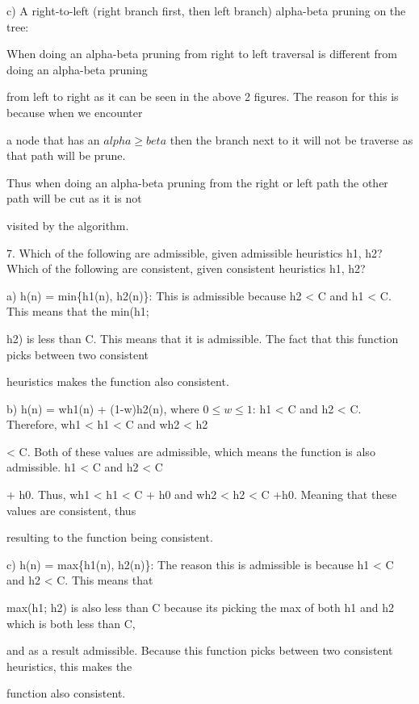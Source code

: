 \documentclass{article}
\begin{document}
c) A right-to-left (right branch first, then left branch)
alpha-beta pruning on the tree:
\newline
{}
\newline
\par
When doing an alpha-beta pruning from right to left traversal is different from doing an alpha-beta pruning 
\par
from left to right as it can be seen in the above 2 figures. The reason for this is because when we encounter 
\par
a node that has an $alpha  \geq  beta $ then the branch next to it will not be traverse as that path will be prune. 
\par
Thus when doing an alpha-beta pruning from the right or left path the other path will be cut as it is not
\par
visited by the algorithm.
\newline
\setlength{\parindent}{0pt}
\par
7. Which of the following are admissible, given admissible heuristics h1, h2? Which of the following
are consistent, given consistent heuristics h1, h2?
\par
\setlength{\parindent}{30pt}
a) h(n) = min\{h1(n), h2(n)\}: This is admissible because h2 < C and h1 < C. This means that the min(h1;
\par
h2) is less than C. This means that it is admissible.
The fact that this function picks between two consistent  
\par
 heuristics makes the function also consistent.
\newline
\par
b) h(n) = wh1(n) + (1-w)h2(n), where $0 \leq w \leq 1$: h1 < C and h2 < C. Therefore, wh1 < h1 < C and wh2 < h2 
\par
< C. Both of these values are admissible, which means the function is also admissible. h1 < C and h2 < C 
\par
+ h0. Thus, wh1 < h1 < C + h0 and wh2 < h2 < C +h0. Meaning that these values are consistent, thus
\par
resulting to the function being consistent.
\newline
\par
c) h(n) = max\{h1(n), h2(n)\}: The reason this is admissible is because h1 < C and h2 < C. This means that 
\par
max(h1; h2) is also less than C because its picking the max of both h1 and h2 which is both less than C, 
\par
and as a result admissible.
Because this function picks between two consistent heuristics, this makes the
\par
function also consistent.
\newline
\end{document}
